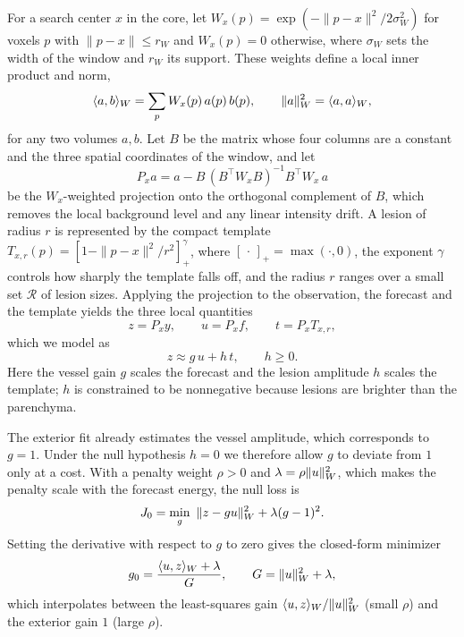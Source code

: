 For a search center $x$ in the core, let $W_x(p)=\exp(-\|p-x\|^2/2\sigma_W^2)$ for voxels $p$ with $\|p-x\|\le r_W$ and $W_x(p)=0$ otherwise, where $\sigma_W$ sets the width of the window and $r_W$ its support. These weights define a local inner product and norm,
\begin{equation}
\langle a,b\rangle_W=\sum_p W_x(p)\,a(p)\,b(p),\qquad \|a\|_W^2=\langle a,a\rangle_W,
\end{equation}
for any two volumes $a,b$. Let $B$ be the matrix whose four columns are a constant and the three spatial coordinates of the window, and let
\begin{equation}
P_x a = a-B\,(B^\top W_x B)^{-1}B^\top W_x\,a
\label{eq:proj}
\end{equation}
be the $W_x$-weighted projection onto the orthogonal complement of $B$, which removes the local background level and any linear intensity drift. A lesion of radius $r$ is represented by the compact template $T_{x,r}(p)=[1-\|p-x\|^2/r^2]_+^{\gamma}$, where $[\,\cdot\,]_+=\max(\cdot,0)$, the exponent $\gamma$ controls how sharply the template falls off, and the radius $r$ ranges over a small set $\mathcal{R}$ of lesion sizes. Applying the projection to the observation, the forecast and the template yields the three local quantities
\begin{equation}
z=P_x y,\qquad u=P_x f,\qquad t=P_x T_{x,r},
\end{equation}
which we model as
\begin{equation}
z\approx g\,u+h\,t,\qquad h\ge 0 .
\label{eq:model}
\end{equation}
Here the vessel gain $g$ scales the forecast and the lesion amplitude $h$ scales the template; $h$ is constrained to be nonnegative because lesions are brighter than the parenchyma.

The exterior fit already estimates the vessel amplitude, which corresponds to $g=1$. Under the null hypothesis $h=0$ we therefore allow $g$ to deviate from $1$ only at a cost. With a penalty weight $\rho>0$ and $\lambda=\rho\|u\|_W^2$, which makes the penalty scale with the forecast energy, the null loss is
\begin{equation}
J_0=\min_g\ \|z-gu\|_W^2+\lambda(g-1)^2 .
\label{eq:null}
\end{equation}
Setting the derivative with respect to $g$ to zero gives the closed-form minimizer
\begin{equation}
g_0=\frac{\langle u,z\rangle_W+\lambda}{G},\qquad G=\|u\|_W^2+\lambda ,
\end{equation}
which interpolates between the least-squares gain $\langle u,z\rangle_W/\|u\|_W^2$ (small $\rho$) and the exterior gain $1$ (large $\rho$).

